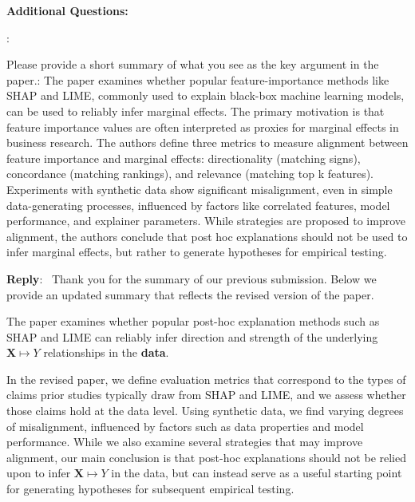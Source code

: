 \documentclass[11pt]{article}
\newcounter{se}[section]
\newcounter{reviewer}
\newcounter{point}[reviewer]
\renewcommand{\thepoint}{R\,\thereviewer.\arabic{point}}
\newenvironment{point}{
    \refstepcounter{point} \bigskip \noindent {\textbf{\thepoint}}: \rmfamily \itshape
}{\medskip}
\newenvironment{reply}
 {\par\medskip \noindent \begin{sf}\textbf{Reply}:\ }
 {\medskip \end{sf}}
\begin{document}
\noindent \textbf{Additional Questions: }

\begin{point}
Please provide a short summary of what you see as the key argument in the paper.: The paper examines whether popular feature-importance methods like SHAP and LIME, commonly used to explain black-box machine learning models, can be used to reliably infer marginal effects. The primary motivation is that feature importance values are often interpreted as proxies for marginal effects in business research. The authors define three metrics to measure alignment between feature importance and marginal effects: directionality (matching signs), concordance (matching rankings), and relevance (matching top k features). Experiments with synthetic data show significant misalignment, even in simple data-generating processes, influenced by factors like correlated features, model performance, and explainer parameters. While strategies are proposed to improve alignment, the authors conclude that post hoc explanations should not be used to infer marginal effects, but rather to generate hypotheses for empirical testing.

\end{point}

\begin{reply}
Thank you for the summary of our previous submission. Below we provide an updated summary that reflects the revised version of the paper.

The paper examines whether popular post-hoc explanation methods such as SHAP and LIME can reliably infer direction and strength of the underlying $\mathbf{X}\mapsto Y$ relationships in the \textbf{data}. 

In the revised paper, we define evaluation metrics that correspond to the types of claims prior studies typically draw from SHAP and LIME, and we assess whether those claims hold at the data level. Using synthetic data, we find varying degrees of misalignment, influenced by factors such as data properties and  model performance. While we also examine several strategies that may improve alignment, our main conclusion is that post-hoc explanations should not be relied upon to infer $\mathbf{X}\mapsto Y$ in the data, but can instead serve as a useful starting point for generating hypotheses for subsequent empirical testing.
\end{reply}
\end{document}
